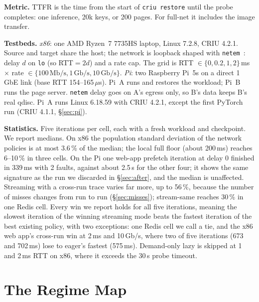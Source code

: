 \documentclass[conference]{IEEEtran}
\newcommand{\us}{\,$\mu$s\xspace}
\newcommand{\mode}[1]{\textsf{#1}}
\begin{document}
\textbf{Metric.} TTFR is the time from the start of \texttt{criu restore}
until the probe completes: one inference, 20k keys, or 200 pages. For
\mode{full-net} it includes the image transfer.

\textbf{Testbeds.} \emph{x86}: one AMD Ryzen~7 7735HS laptop, Linux 7.2.8,
CRIU 4.2.1. Source and target share the host; the network is loopback
shaped with \texttt{netem}~\cite{hemminger2005netem}: delay $d$ on
\texttt{lo} (so RTT${}=2d$) and a rate cap. The grid is RTT
$\in\{0, 0.2, 1, 2\}$\,ms $\times$ rate $\in\{100\,\text{Mb/s},
1\,\text{Gb/s}, 10\,\text{Gb/s}\}$. \emph{Pi}: two Raspberry Pi~5s on a
direct 1\,GbE link (base RTT 154--165\us). Pi~A runs and restores the
workload; Pi~B runs the page server. \texttt{netem} delay goes on A's egress
only, so B's data keeps B's real qdisc. Pi~A runs Linux 6.18.59 with CRIU
4.2.1, except the first PyTorch run (CRIU 4.1.1, \S\ref{sec:pi}).

\textbf{Statistics.} Five iterations per cell, each with a fresh workload
and checkpoint. We report medians. On x86 the population standard
deviation of the network policies is at most 3.6\,\% of the median; the
local \mode{full} floor (about 200\,ms) reaches 6--10\,\% in three cells.
On the Pi one web-app \mode{prefetch} iteration at delay 0 finished in
339\,ms with 2 faults, against about 2.5\,s for the other four; it shows
the same signature as the run we discarded in \S\ref{sec:after}, and the
median is unaffected. Streaming with a cross-run trace varies far more, up
to 56\,\%, because the number of misses changes from run to run
(\S\ref{sec:misses}); \mode{stream-same} reaches 30\,\% in one Redis cell.
Every win we report holds for all five iterations, meaning the slowest
iteration of the winning streaming mode beats the fastest iteration of the
best existing policy, with two exceptions: one Redis cell we call a tie,
and the x86 web app's cross-run win at 2\,ms and 10\,Gb/s, where two of
five iterations (673 and 702\,ms) lose to eager's fastest (575\,ms). Demand-only \mode{lazy} is skipped at 1 and 2\,ms
RTT on x86, where it exceeds the 30\,s probe timeout.

\section{The Regime Map}
\label{sec:map}
\end{document}
